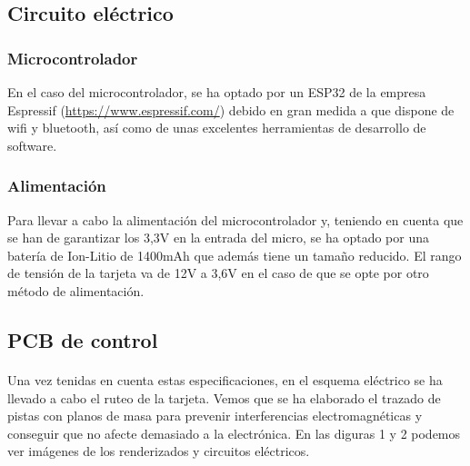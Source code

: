 \documentclass[paper=a4, fontsize=11pt,twoside]{scrartcl}	%
\begin{document}
    \subsection{Circuito eléctrico}
        \subsubsection{Microcontrolador} 
            En el caso del microcontrolador, se ha optado por un ESP32 de la empresa Espressif (\url{https://www.espressif.com/})
            debido en gran medida a que dispone de wifi y bluetooth, así como de unas excelentes herramientas
            de desarrollo de software. 
        \subsubsection{Alimentación} 
            Para llevar a cabo la alimentación del microcontrolador y, teniendo en cuenta que se han de garantizar los 3,3V en la entrada
            del micro, se ha optado por una batería de Ion-Litio de 1400mAh que además tiene un tamaño reducido. El rango de tensión de la
            tarjeta va de 12V a 3,6V en el caso de que se opte por otro método de alimentación.
    \subsection{PCB de control}
        \paragraph{}
        Una vez tenidas en cuenta estas especificaciones, en el esquema eléctrico se ha llevado a cabo el ruteo de la tarjeta.
        Vemos que se ha elaborado el trazado de pistas con planos de masa para prevenir interferencias electromagnéticas
        y conseguir que no afecte demasiado a la electrónica. En las diguras 1 y 2 podemos ver imágenes de los renderizados y circuitos 
        eléctricos.
        
\end{document}
